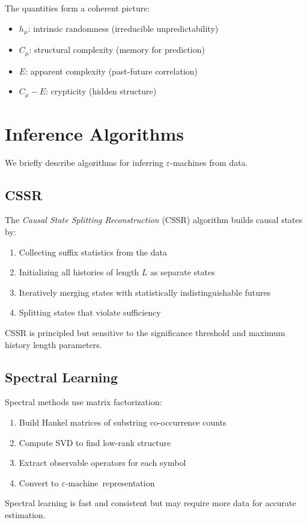 \documentclass[11pt,twocolumn]{article}
\theoremstyle{plain}
\theoremstyle{definition}
\theoremstyle{remark}
\newcommand{\eps}{\varepsilon}
\newcommand{\eM}{$\eps$-machine}
\newcommand{\Cmu}{C_\mu}
\newcommand{\hmu}{h_\mu}
\begin{document}
The quantities form a coherent picture:
\begin{itemize}[nosep]
    \item $\hmu$: intrinsic randomness (irreducible unpredictability)
    \item $\Cmu$: structural complexity (memory for prediction)
    \item $E$: apparent complexity (past-future correlation)
    \item $\Cmu - E$: crypticity (hidden structure)
\end{itemize}

\section{Inference Algorithms}
\label{sec:inference}

We briefly describe algorithms for inferring \eM s from data.

\subsection{CSSR}

The \emph{Causal State Splitting Reconstruction} (CSSR) algorithm \cite{shalizi2004algorithm} builds causal states by:
\begin{enumerate}[nosep]
    \item Collecting suffix statistics from the data
    \item Initializing all histories of length $L$ as separate states
    \item Iteratively merging states with statistically indistinguishable futures
    \item Splitting states that violate sufficiency
\end{enumerate}
CSSR is principled but sensitive to the significance threshold and maximum history length parameters.

\subsection{Spectral Learning}

Spectral methods \cite{hsu2012spectral,boots2011closing} use matrix factorization:
\begin{enumerate}[nosep]
    \item Build Hankel matrices of substring co-occurrence counts
    \item Compute SVD to find low-rank structure
    \item Extract observable operators for each symbol
    \item Convert to \eM\ representation
\end{enumerate}
Spectral learning is fast and consistent but may require more data for accurate estimation.
\end{document}
